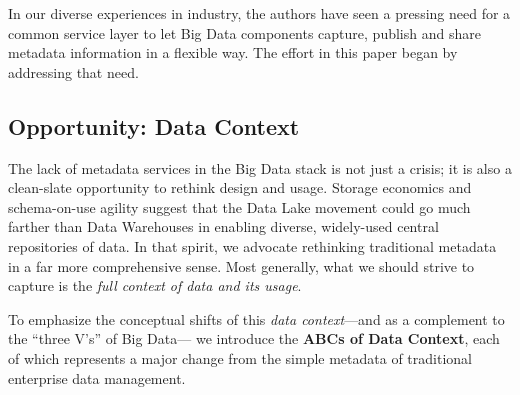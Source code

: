 \documentclass{sig-alternate}
\begin{document}
In our diverse experiences in industry, the authors have seen a pressing need for a common service layer to let Big Data components capture, publish and share metadata information in a flexible way. The effort in this paper began by addressing that need.

\subsection{Opportunity: Data Context}
The lack of metadata services in the Big Data stack is not just a crisis; it is also a clean-slate opportunity to rethink design and usage. Storage economics and schema-on-use agility suggest that the Data Lake movement could go much farther than Data Warehouses in enabling diverse, widely-used central repositories of data.
In that spirit, we advocate rethinking traditional metadata in a far more comprehensive sense. Most generally, what we should strive to capture is the \emph{full context of data and its usage}. 

To emphasize the conceptual shifts of this \emph{data context}---and as a complement to the ``three V's'' of Big Data---
we introduce the \textbf{ABCs of Data Context}, each of which represents a major change from the simple metadata of traditional enterprise data management.



\end{document}

